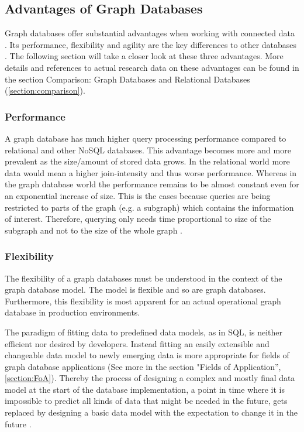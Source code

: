 \subsection{Advantages of Graph Databases}
Graph databases offer substantial advantages when working with connected data \autocite{maheshlal2015}. Its performance, flexibility and agility are the key differences to other databases \autocite{graphdb2015}. The following section will take a closer look at these three advantages. More details and references to actual research data on these advantages can be found in the section Comparison: Graph Databases and Relational Databases (\ref{section:comparison}).

\subsubsection{Performance}
A graph database has much higher query processing performance compared to relational and other NoSQL databases. This advantage becomes more and more prevalent as the size/amount of stored data grows. In the relational world more data would mean a higher join-intensity and thus worse performance. Whereas in the graph database world the performance remains to be almost constant even for an exponential increase of size. This is the cases because queries are being restricted to parts of the graph (e.g. a subgraph) which contains the information of interest.  Therefore, querying only needs time proportional to size of the subgraph and not to the size of the whole graph \autocite{maheshlal2015, graphdb2015}.

\subsubsection{Flexibility}
The flexibility of a graph databases must be understood in the context of the graph database model. The model is flexible and so are graph databases. Furthermore, this flexibility is most apparent for an actual operational graph database in production environments.

The paradigm of fitting data to predefined data models, as in SQL, is neither efficient nor desired by developers. Instead fitting an easily extensible and changeable data model to newly emerging data is more appropriate for fields of graph database applications (See more in the section "Fields of Application”, \ref{section:FoA}). Thereby the process of designing a complex and mostly final data model at the start of the database implementation, a point in time where it is impossible to predict all kinds of data that might be needed in the future, gets replaced by designing a basic data model with the expectation to change it in the future \autocite{maheshlal2015, graphdb2015}.

